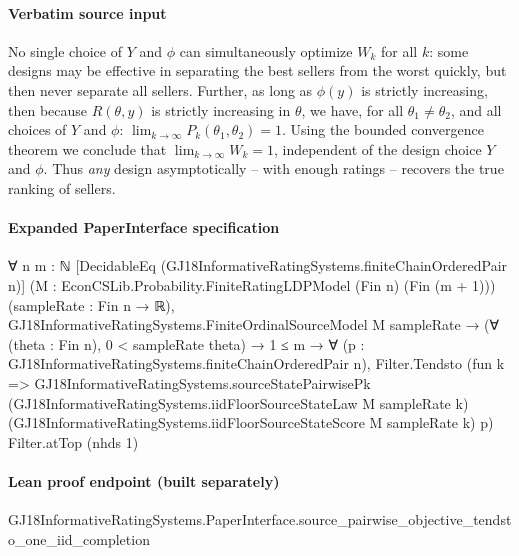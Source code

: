 \documentclass[10pt]{article}
\begin{document}
\paragraph{Verbatim source input}
\begin{ReviewVerbatim}
No single choice of $Y$ and $\phi$ can simultaneously optimize $W_k$ for all $k$: some designs may be effective in separating the best sellers from the worst quickly, but then never separate all sellers. Further, as long as $\phi(y)$ is strictly increasing, then because $R(\theta, y)$ is strictly increasing in $\theta$, we have, for all $\theta_1\neq \theta_2$, and all choices of $Y$ and $\phi$:
$\lim_{k \to \infty} P_k(\theta_1, \theta_2) = 1$. Using the bounded convergence theorem we conclude that $\lim_{k \to \infty} W_k = 1 $, independent of the design choice $Y$ and $\phi$.  Thus {\em any} design asymptotically  -- with enough ratings -- recovers the true ranking of sellers.
\end{ReviewVerbatim}


\paragraph{Expanded PaperInterface specification}
\begin{ReviewVerbatim}
∀ {n m : ℕ} [DecidableEq (GJ18InformativeRatingSystems.finiteChainOrderedPair n)]
  (M : EconCSLib.Probability.FiniteRatingLDPModel (Fin n) (Fin (m + 1))) (sampleRate : Fin n → ℝ),
  GJ18InformativeRatingSystems.FiniteOrdinalSourceModel M sampleRate →
    (∀ (theta : Fin n), 0 < sampleRate theta) →
      1 ≤ m →
        ∀ (p : GJ18InformativeRatingSystems.finiteChainOrderedPair n),
          Filter.Tendsto
            (fun k =>
              GJ18InformativeRatingSystems.sourceStatePairwisePk
                (GJ18InformativeRatingSystems.iidFloorSourceStateLaw M sampleRate k)
                (GJ18InformativeRatingSystems.iidFloorSourceStateScore M sampleRate k) p)
            Filter.atTop (nhds 1)
\end{ReviewVerbatim}

\paragraph{Lean proof endpoint (built separately)}\begin{ReviewVerbatim}
GJ18InformativeRatingSystems.PaperInterface.source_pairwise_objective_tendsto_one_iid_completion
\end{ReviewVerbatim}
\end{document}
